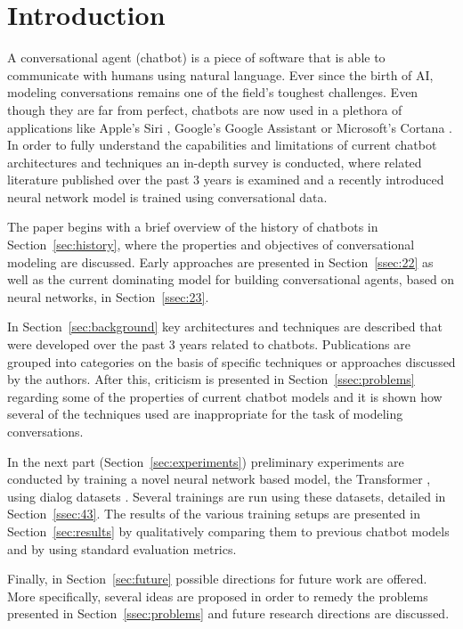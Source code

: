\documentclass[12pt]{article}
\begin{document}
\newpage\tableofcontents
\newpage\section{Introduction} \label{sec:intro}

A conversational agent (chatbot) is a piece of software that is able to communicate with humans using natural language. Ever since the birth of AI, modeling conversations remains one of the field's toughest challenges. Even though they are far from perfect, chatbots are now used in a plethora of applications like Apple's Siri \cite{Siri:2017}, Google's Google Assistant \cite{Google:2017} or Microsoft's Cortana \cite{Cortana:2017}. In order to fully understand the capabilities and limitations of current chatbot architectures and techniques an in-depth survey is conducted, where related literature published over the past 3 years is examined and a recently introduced neural network model is trained using conversational data. 

The paper begins with a brief overview of the history of chatbots in Section~\ref{sec:history}, where the properties and objectives of conversational modeling are discussed. Early approaches are presented in Section~\ref{ssec:22} as well as the current dominating model for building conversational agents, based on neural networks, in Section~\ref{ssec:23}.

In Section~\ref{sec:background} key architectures and techniques are described that were developed over the past 3 years related to chatbots. Publications are grouped into categories on the basis of specific techniques or approaches discussed by the authors. After this, criticism is presented in Section~\ref{ssec:problems} regarding some of the properties of current chatbot models and it is shown how several of the techniques used are inappropriate for the task of modeling conversations.

In the next part (Section~\ref{sec:experiments}) preliminary experiments are conducted by training a novel neural network based model, the Transformer \cite{Vaswani:2017}, using dialog datasets \cite{Danescu:2011,Tiedemann:2009,OpenSubtitles:2016}. Several trainings are run using these datasets, detailed in Section~\ref{ssec:43}. The results of the various training setups are presented in Section~\ref{sec:results} by qualitatively comparing them to previous chatbot models and by using standard evaluation metrics.

Finally, in Section~\ref{sec:future} possible directions for future work are offered. More specifically, several ideas are proposed in order to remedy the problems presented in Section~\ref{ssec:problems} and future research directions are discussed.
\end{document}
